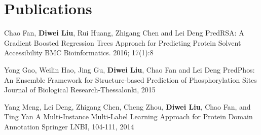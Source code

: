 \documentclass[11pt,a4paper]{moderncv}
\begin{document}
\section{Publications}

\cventry{[1]}
{\textnormal{Chao Fan,}\textbf{ Diwei Liu}\textnormal{, Rui Huang, Zhigang Chen and Lei Deng}}
{PredRSA: A Gradient Boosted Regression Trees Approach for Predicting Protein Solvent Accessibility}
{BMC Bioinformatics. 2016; 17(1):8}
{}{}{}


\cventry{[2]}
{\textnormal{Yong Gao, Weilin Hao, Jing Gu,}\textbf{ Diwei Liu}\textnormal{, Chao Fan and Lei Deng}}
{PredPhos: An Ensemble Framework for Structure-based Prediction of Phosphorylation Sites}
{Journal of Biological Research-Thessalonki, 2015}
{}{}{}

\cventry{[3]}
{\textnormal{Yang Meng, Lei Deng, Zhigang Chen, Cheng Zhou,}\textbf{ Diwei Liu}\textnormal{, Chao Fan, and Ting Yan}}
{A Multi-Instance Multi-Label Learning Approach for Protein Domain Annotation}
{Springer LNBI, 104-111, 2014}
{}{}{}





\end{document}
